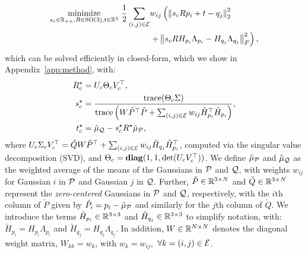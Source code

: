 \begin{equation}
    \label{eq:coarse_registration}
    \begin{aligned}
        \underset{s_{c} \in \mathbb{R}_{++}, R \in \mathrm{SO}(3), t \in \mathbb{R}^{3}}{\mathrm{minimize}}\  \frac{1}{2} \sum_{(i, j) \in \mathcal{E}} & w_{ij} \left(\left\Vert s_{c}Rp_{i} + t - q_{j} \right\Vert_{2}^{2} \right. \\
        & \left. + \left\Vert s_{c}R H_{p_{i}}  \Lambda_{p_{i}} - H_{q_{j}}  \Lambda_{q_{j}} \right\Vert_{F}^{2} \right),
    \end{aligned}
\end{equation}
which can be solved efficiently in closed-form, which we show in Appendix~\ref{app:method}, with:
\begin{align}
    R_{c}^{\star} &= U_{c} \Theta_{c} V_{c}^{\top}, \label{eq:coarse_registration_opt_R} \\
    s_{c}^{\star} &= \frac{\mathrm{trace}(\Theta_{c} \Sigma)}{\mathrm{trace}\left(W\check{P}^{\top}\check{P} + \sum_{(i, j) \in \mathcal{E}} w_{ij} \check{H}_{p_{i}}^{\top}\check{H}_{p_{i}}\right)}, \label{eq:coarse_registration_opt_scale} \\
    t_{c}^{\star} &= \tilde{\mu}_{\mathcal{Q}} - s_{c}^{\star} R^{\star} \tilde{\mu}_{\mathcal{P}}, \label{eq:coarse_registration_opt_translation}
\end{align}
where ${U_{c} \Sigma_{c} V_{c}^{\top} = \check{Q}W\check{P}^{\top}
+ \sum_{(i, j) \in \mathcal{E}} w_{ij} \check{H}_{q_{j}}\check{H}_{p_{i}}^{\top}}$, computed via the singular value decomposition (SVD),
and ${\Theta_{c} = \mathrm{\mathbf{diag}}(1, 1, \det(U_{c}V_{c}^{\top}))}$.
We define ${\tilde{\mu}_{\mathcal{P}}}$ and ${\tilde{\mu}_{\mathcal{Q}}}$ as the weighted average of the means of the Gaussians in $\mathcal{P}$ and $\mathcal{Q}$, with weights $w_{ij}$ for Gaussian $i$ in $\mathcal{P}$ and Gaussian $j$ in $\mathcal{Q}$. Further, ${\check{P} \in \mathbb{R}^{3 \times N}}$ and ${\check{Q} \in \mathbb{R}^{3 \times N}}$ represent the \emph{zero-centered} Gaussians in $\mathcal{P}$ and ${\mathcal{Q}}$, respectively, with the $i$th column of $\check{P}$ given by ${\check{P}_{i} = p_{i} - \tilde{\mu}_{\mathcal{P}}}$ and similarly for the $j$th column of $\check{Q}$.  We introduce the terms ${\check{H}_{p_{i}} \in \mathbb{R}^{3 \times 3}}$ and ${\check{H}_{q_{j}} \in \mathbb{R}^{3 \times 3}}$ to simplify notation, with: ${\check{H}_{p_{i}} = H_{p_{i}}  \Lambda_{p_{i}}}$ and ${\check{H}_{q_{j}} = H_{q_{j}}  \Lambda_{q_{j}}}$. In addition, ${W \in \mathbb{R}^{N \times N}}$ denotes the diagonal weight matrix, ${W_{kk} = w_{k}}$, with ${w_{k} = w_{ij}}$,~${\forall k = (i, j) \in \mathcal{E}}$.


